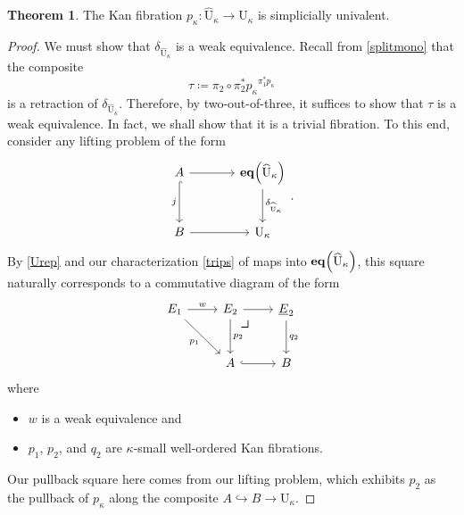 \documentclass[10pt,letterpaper,cm]{nupset}
\theoremstyle{definition}
\theoremstyle{theorem}
\newtheorem{theorem}[definition]{Theorem}
\theoremstyle{remark}
\newcommand{\0}{\mathbf{0}}
\newcommand{\1}{\mathbf{1}}
\newcommand{\2}{\mathbf{2}}
\newcommand{\bi}{\begin{itemize}}
\newcommand{\ei}{\end{itemize}}
\begin{document}
\begin{theorem}
The Kan fibration $p_{\kappa} : \widehat{\mathrm{U}}_{\kappa} \to \mathrm{U}_{\kappa}$ is simplicially univalent. %
\end{theorem}
\begin{proof}
We must show that $\delta_{\widehat{\mathrm{U}}_{\kappa}}$ is a weak equivalence. Recall from \eqref{splitmono} that the composite 
$$\tau \coloneqq \pi_2\circ \pi_2^{\ast}{p_{\kappa}}^{\pi_1^{\ast}{p_{\kappa}}}$$ is a retraction of $\delta_{\widehat{\mathrm{U}}_{\kappa}}$. Therefore, by two-out-of-three, it suffices to show that $\tau$ is a weak equivalence. In fact, we shall show that it is a trivial fibration. To this end, consider any lifting problem of the form
\[
\begin{tikzcd}[row sep=large, column sep=large]
A \arrow[r] \arrow[d, "j"', hook] & \mathbf{eq}\mleft(\widehat{\mathrm{U}}_{\kappa}\mright) \arrow[d, "\delta_{\widehat{\mathrm{U}}_{\kappa}}"] \\
B \arrow[r]                       & \mathrm{U}_{\kappa}                                                                                      
\end{tikzcd}
.\]
By \cref{Urep} and our characterization \eqref{trips} of maps into $\mathbf{eq}\mleft(\widehat{\mathrm{U}}_{\kappa}\mright)$, this square naturally corresponds  to a commutative diagram of the form 
\[
\begin{tikzcd}[row sep=large]
E_1 \arrow[r, "w"] \arrow[rd, "p_1"'] & E_2 \arrow[d, "p_2"] \arrow[r] \arrow[dr, phantom, "\scalebox{1.5}{\color{black}$\lrcorner$}" , very near start, color=black]
& \underline{E}_2 \arrow[d, "q_2"] \\
                                      & A \arrow[r, hook]               & B                   
\end{tikzcd}
\] where
\bi
\item $w$ is a weak equivalence and 
\item $p_1$, $p_2$, and $q_2$ are $\kappa$-small well-ordered Kan fibrations.
\ei Our pullback square here comes from our lifting problem, which exhibits $p_2$ as the pullback of $p_{\kappa}$ along the composite $A \hookrightarrow B \to \mathrm{U}_{\kappa}$.

\smallskip


\end{proof}
\end{document}
